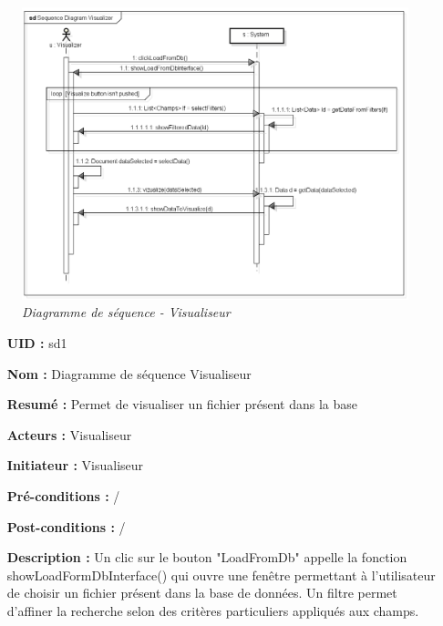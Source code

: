  
\begin{figure}[h]
	\begin{center}
		\includegraphics[scale = 0.4]{img/SeqDiagVisualizer.png}
	\end{center}
	\caption{\it Diagramme de séquence - Visualiseur}
	\label{seqDiagVisualizer}
\end{figure}

\begin{itemize}
	\item[{\bf UID :}] sd1
	\item[{\bf Nom :}] Diagramme de séquence Visualiseur
	\item[{\bf Resumé :}]  Permet de visualiser un fichier présent dans la base
	\item[{\bf Acteurs :}] Visualiseur
	\item[{\bf Initiateur :}] Visualiseur
	\item[{\bf Pré-conditions :}]  /
	\item[{\bf Post-conditions :}]  /
\smallbreak
	\item[{\bf Description :}]
	Un clic sur le bouton "LoadFromDb" appelle la fonction showLoadFormDbInterface() qui ouvre une fenêtre permettant à l'utilisateur de choisir un fichier présent dans la base de données. Un filtre permet d'affiner la recherche selon des critères particuliers appliqués aux champs.
\end{itemize}

